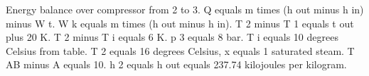 Energy balance over compressor from 2 to 3.
Q equals m times (h out minus h in) minus W t.
W k equals m times (h out minus h in).
T 2 minus T 1 equals t out plus 20 K.
T 2 minus T i equals 6 K.
p 3 equals 8 bar.
T i equals 10 degrees Celsius from table.
T 2 equals 16 degrees Celsius, x equals 1 saturated steam.
T AB minus A equals 10.
h 2 equals h out equals 237.74 kilojoules per kilogram.